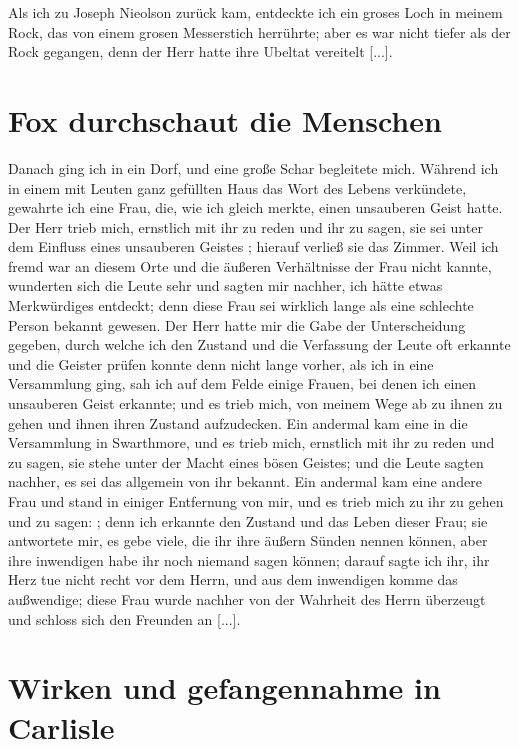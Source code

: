 Als ich zu Joseph
Nieolson zurück kam, entdeckte ich ein groses Loch in meinem
Rock, das von einem grosen Messerstich herrührte; aber es war
nicht tiefer als der Rock gegangen, denn der Herr hatte ihre
Ubeltat vereitelt [...].

\section{Fox durchschaut die Menschen}

Danach ging ich in ein Dorf, und eine große Schar
begleitete mich. Während ich in einem mit Leuten ganz gefüllten
Haus das Wort des Lebens verkündete, gewahrte ich eine Frau,
die, wie ich gleich merkte, einen unsauberen Geist hatte. Der
Herr trieb mich, ernstlich mit ihr zu reden und ihr zu sagen, sie
sei unter dem Einfluss eines unsauberen 
Geistes
; 
hierauf verließ
sie das Zimmer. Weil ich fremd war an diesem Orte und die
äußeren Verhältnisse der Frau nicht kannte, wunderten sich die
Leute sehr und sagten mir nachher, ich hätte etwas Merkwürdiges
entdeckt; denn diese Frau sei wirklich lange als eine schlechte
Person bekannt gewesen. Der Herr hatte mir die Gabe der
Unterscheidung gegeben, durch welche ich den Zustand und die
Verfassung der Leute oft erkannte und die Geister prüfen konnte
denn nicht lange vorher, als ich in eine Versammlung ging, sah
ich auf dem Felde einige Frauen, bei denen ich einen unsauberen
Geist erkannte; und es trieb mich, von meinem Wege ab zu ihnen
zu gehen und ihnen ihren Zustand aufzudecken. Ein andermal
kam eine in die Versammlung in Swarthmore, 
und es trieb mich,
ernstlich mit ihr zu reden und zu sagen, sie stehe unter der Macht
eines bösen Geistes; und die Leute sagten 
nachher, es sei das
allgemein von ihr bekannt. Ein andermal kam eine andere Frau
und stand in einiger Entfernung von mir, und es trieb mich zu
ihr zu gehen und zu sagen: ; denn
ich erkannte den Zustand und das Leben dieser Frau; sie antwortete
mir, es gebe viele, die ihr ihre äußern Sünden nennen können,
aber ihre inwendigen habe ihr noch niemand sagen können; darauf
sagte ich ihr, ihr Herz tue nicht recht vor dem Herrn, und
aus dem inwendigen komme das außwendige; diese Frau wurde
nachher von der Wahrheit des Herrn überzeugt und schloss sich
den Freunden an [...].

\section{Wirken und gefangennahme in Carlisle}


